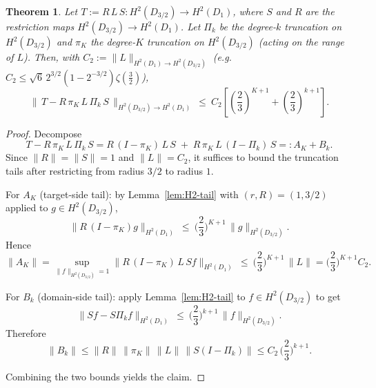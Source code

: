 \documentclass[11pt]{article}
\newtheorem{theorem}[definition]{Theorem}
\newtheorem{corollary}[definition]{Corollary}
\begin{document}
\begin{theorem}
\label{thm:trunc-H2-correct}
Let $T:=R\,L\,S: H^2(D_{3/2})\to H^2(D_1)$, where $S$ and $R$ are the restriction maps
$H^2(D_{3/2})\to H^2(D_1)$. Let $\Pi_k$ be the degree-$k$ truncation on $H^2(D_{3/2})$
and $\pi_K$ the degree-$K$ truncation on $H^2(D_{3/2})$ (acting on the \emph{range} of $L$).
Then, with $C_2:=\|L\|_{H^2(D_1)\to H^2(D_{3/2})}$ (e.g. $C_2\le\sqrt6\,2^{3/2}(1-2^{-3/2})\zeta(\tfrac32)$),
\[
\big\|\,T - R\,\pi_K\,L\,\Pi_k\,S\,\big\|_{H^2(D_{3/2})\to H^2(D_1)}
\ \le\
C_2\!\left[\left(\frac{2}{3}\right)^{K+1}
+\left(\frac{2}{3}\right)^{k+1}\right].
\]
\end{theorem}

\begin{proof}
Decompose
\[
T - R\,\pi_K\,L\,\Pi_k\,S
= R\,(I-\pi_K)\,L\,S \;+\; R\,\pi_K\,L\,(I-\Pi_k)\,S
=: A_K + B_k .
\]
Since $\|R\|=\|S\|=1$ and $\|L\|=C_2$, it suffices to bound the truncation tails after
restricting from radius $3/2$ to radius $1$.

For $A_K$ (target-side tail):
by Lemma~\ref{lem:H2-tail} with $(r,R)=(1,3/2)$ applied to $g\in H^2(D_{3/2})$,
\[
\|R\,(I-\pi_K)g\|_{H^2(D_1)}
\ \le\ \Big(\frac{2}{3}\Big)^{K+1}\,\|g\|_{H^2(D_{3/2})}.
\]
Hence
\[
\|A_K\|
=\sup_{\|f\|_{H^2(D_{3/2})}=1}
\|R\,(I-\pi_K)\,L\,S f\|_{H^2(D_1)}
\ \le\ \Big(\frac{2}{3}\Big)^{K+1}\,\|L\|
= \Big(\frac{2}{3}\Big)^{K+1} C_2.
\]

For $B_k$ (domain-side tail):
apply Lemma~\ref{lem:H2-tail} to $f\in H^2(D_{3/2})$ to get
\[
\|S f - S\Pi_k f\|_{H^2(D_1)}
\ \le\ \Big(\frac{2}{3}\Big)^{k+1}\,\|f\|_{H^2(D_{3/2})}.
\]
Therefore
\[
\|B_k\|
\le \|R\|\,\|\pi_K\|\,\|L\|\,\|S(I-\Pi_k)\|
\le C_2\,\Big(\frac{2}{3}\Big)^{k+1}.
\]

Combining the two bounds yields the claim.
\end{proof}


\end{document}
